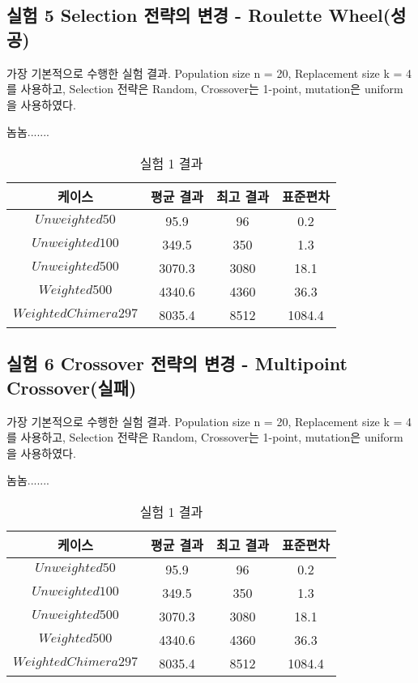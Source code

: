 \documentclass{article}
\begin{document}
\subsection{실험 5 Selection 전략의 변경 - Roulette Wheel(성공)}

가장 기본적으로 수행한 실험 결과. Population size n = 20, Replacement size k = 4를 사용하고, Selection 전략은 Random, Crossover는 1-point, mutation은 uniform 을 사용하였다.

놈놈.......


 \begin{table}[h]
 \begin{center}
\caption{실험 1 결과}
\begin{tabular}{cccc}
\hline\hline
케이스 & 평균 결과 & 최고 결과 & 표준편차\\
\hline\hline
$Unweighted 50$ & 95.9 & 96 & 0.2 \\
\hline
$Unweighted 100$ & 349.5 & 350 & 1.3\\
\hline
$Unweighted 500$ & 3070.3 & 3080 & 18.1\\
\hline
$Weighted 500$ & 4340.6 & 4360 & 36.3\\
\hline
$Weighted Chimera 297$ & 8035.4 & 8512 & 1084.4\\
\hline
\end{tabular}
\end{center}
\end{table}

\subsection{실험 6 Crossover 전략의 변경 - Multipoint Crossover(실패)}

가장 기본적으로 수행한 실험 결과. Population size n = 20, Replacement size k = 4를 사용하고, Selection 전략은 Random, Crossover는 1-point, mutation은 uniform 을 사용하였다.

놈놈.......


 \begin{table}[h]
 \begin{center}
\caption{실험 1 결과}
\begin{tabular}{cccc}
\hline\hline
케이스 & 평균 결과 & 최고 결과 & 표준편차\\
\hline\hline
$Unweighted 50$ & 95.9 & 96 & 0.2 \\
\hline
$Unweighted 100$ & 349.5 & 350 & 1.3\\
\hline
$Unweighted 500$ & 3070.3 & 3080 & 18.1\\
\hline
$Weighted 500$ & 4340.6 & 4360 & 36.3\\
\hline
$Weighted Chimera 297$ & 8035.4 & 8512 & 1084.4\\
\hline
\end{tabular}
\end{center}
\end{table}
\end{document}
